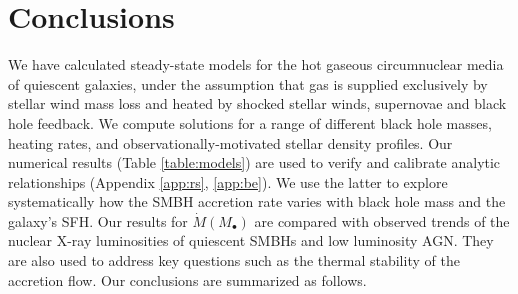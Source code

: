 \documentclass[usenatbib,fleqn]{mn2e}
\newcommand{\Mbh}[1][]{M_{\bullet#1}}
\begin{document}
\section{Conclusions}
\label{sec:conclusions}

We have calculated steady-state models for the hot gaseous
circumnuclear media of quiescent galaxies, under the assumption that
gas is supplied exclusively by stellar wind mass loss and heated by
shocked stellar winds, supernovae and black hole feedback.  We compute
solutions for a range of different black hole masses, heating rates,
and observationally-motivated stellar density profiles.  Our numerical
results (Table \ref{table:models}) are used to verify and calibrate
analytic relationships (Appendix \ref{app:rs}, \ref{app:be}).  We use
the latter to explore systematically how the SMBH accretion rate
varies with black hole mass and the galaxy's SFH.  Our results for
$\dot{M}(\Mbh)$ are compared with observed trends of the nuclear X-ray
luminosities of quiescent SMBHs and low luminosity AGN.  They are also
used to address key questions such as the thermal stability of the
accretion flow.  Our conclusions are summarized as follows.
\end{document}
